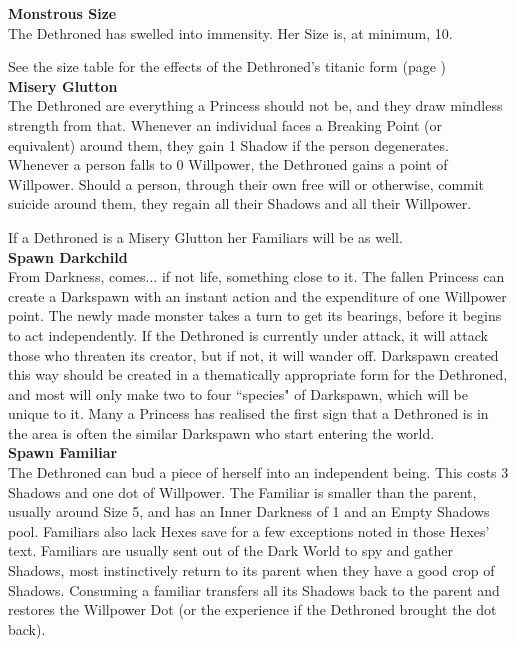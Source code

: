\noindent \textbf{Monstrous Size}\\

The Dethroned has swelled into immensity. Her Size is, at minimum, 10.

See the size table for the effects of the Dethroned's titanic form (page \pageref{SizeTable})\\

\noindent \textbf{Misery Glutton}\\

\noindent The Dethroned are everything a Princess should not be, and they draw mindless strength from that. Whenever an individual faces a Breaking Point (or equivalent) around them, they gain 1 Shadow if the person degenerates. Whenever a person falls to 0 Willpower, the Dethroned gains a point of Willpower. Should a person, through their own free will or otherwise, commit suicide around them, they regain all their Shadows and all their Willpower.

If a Dethroned is a Misery Glutton her Familiars will be as well.\\

\noindent \textbf{Spawn Darkchild}\\

\noindent From Darkness, comes... if not life, something close to it. The fallen Princess can create a Darkspawn with an instant action and the expenditure of one Willpower point. The newly made monster takes a turn to get its bearings, before it begins to act independently. If the Dethroned is currently under attack, it will attack those who threaten its creator, but if not, it will wander off. Darkspawn created this way should be created in a thematically appropriate form for the Dethroned, and most will only make two to four \textquotedblleft species" of Darkspawn, which will be unique to it. Many a Princess has realised the first sign that a Dethroned is in the area is often the similar Darkspawn who start entering the world.\\

\noindent \textbf{Spawn Familiar}\\

\noindent The Dethroned can bud a piece of herself into an independent being. This costs 3 Shadows and one dot of Willpower. The Familiar is smaller than the parent, usually around Size 5, and has an Inner Darkness of 1 and an Empty Shadows pool. Familiars also lack Hexes save for a few exceptions noted in those Hexes' text. Familiars are usually sent out of the Dark World to spy and gather Shadows, most instinctively return to its parent when they have a good crop of Shadows. Consuming a familiar transfers all its Shadows back to the parent and restores the Willpower Dot (or the experience if the Dethroned brought the dot back).\\

